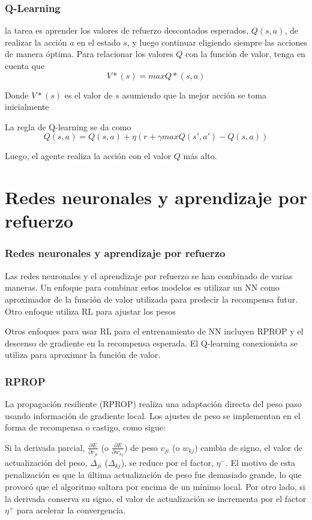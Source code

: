 \documentclass[
	11pt, %
]{beamer}
\begin{document}
\begin{frame}

  \frametitle{Q-Learning}

  la tarea es aprender los valores de refuerzo descontados esperados, $Q(s,a)$, de realizar la acción $a$ en el estado $s$, y luego continuar eligiendo siempre las acciones de manera óptima. Para relacionar los valores $Q$ con la función de valor, tenga en cuenta que \[ V*(s) = max Q*(s,a)\]

  Donde $V*(s)$ es el valor de $s$ asumiendo que la mejor acción se toma inicialmente

  \bigskip %
  
  La regla de Q-learning se da como\\

  \[ Q(s,a) = Q(s,a) + \eta(r+\gamma max Q(s',a') - Q(s,a))\]

  Luego, el agente realiza la acción con el valor $Q$ más alto.
  
\end{frame}

\section{Redes neuronales y aprendizaje por refuerzo}
\begin{frame}
  \frametitle{Redes neuronales y aprendizaje por refuerzo}

  Las redes neuronales y el aprendizaje por refuerzo se han combinado de varias maneras. Un enfoque para combinar estos modelos es utilizar un NN como aproximador de la función de valor utilizada para predecir la recompensa futur. Otro enfoque utiliza RL para ajustar los pesos

  \bigskip %

  Otros enfoques para usar RL para el entrenamiento de NN incluyen RPROP y el descenso de gradiente en la recompensa esperada. El Q-learning conexionista se utiliza para aproximar la función de valor.
  
\end{frame}

\begin{frame}
  \frametitle{RPROP}

  La propagación resiliente (RPROP) realiza una adaptación directa del peso paso usando información de gradiente local. Los ajustes de peso se implementan en el forma de recompensa o castigo, como sigue:

  \bigskip

  Si la derivada parcial, $\frac{\partial E}{\partial v_{ji}}$ (o $\frac{\partial E}{\partial w_{kj}}$) de peso $v_{ji}$ (o $w_{kj}$) cambia de signo, el valor de actualización del peso, $\Delta_{ji}$ ($\Delta_{kj}$), se reduce por el factor, $\eta^{-}$. El motivo de esta penalización es que la última actualización de peso fue demasiado grande, lo que provocó que el algoritmo saltara por encima de un mínimo local. Por otro lado, si la derivada conserva su signo, el valor de actualización se incrementa por el factor $\eta^{+}$ para acelerar la convergencia.
  
\end{frame}
\end{document}
